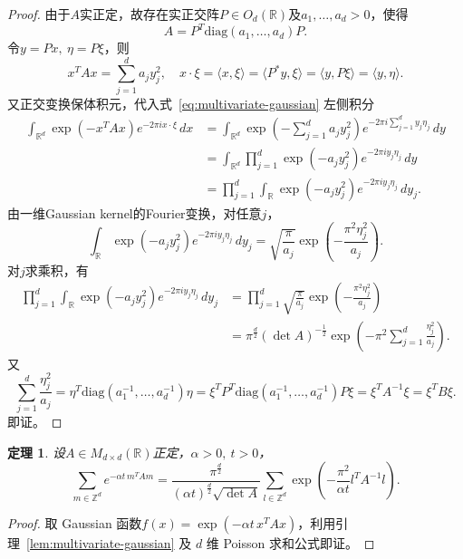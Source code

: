 \documentclass[UTF8,zihao=5,linespread=1.34]{ctexart}
\theoremstyle{cnplain}
\newtheorem{theorem}{定理}[section]
\theoremstyle{cnremark}
\begin{document}
\begin{proof}
由于$A$实正定，故存在实正交阵$P \in O_{d}(\mathbb{R})$及$a_{1}, \dots, a_{d} > 0$，使得
\[
A = P^{T} \mathrm{diag}(a_{1}, \dots, a_{d}) P.
\]
令$y = Px,\ \eta = P\xi$，则
\[
x^{T}Ax = \sum_{j=1}^{d} a_{j} y_{j}^{2},\quad x \cdot \xi = \langle x, \xi \rangle = \langle P^{\ast}y, \xi \rangle = \langle y, P\xi \rangle = \langle y, \eta \rangle.
\]
又正交变换保体积元，代入式~\eqref{eq:multivariate-gaussian} 左侧积分
\begin{align*}
\int_{\mathbb{R}^{d}} \exp(-x^{T} A x) e^{-2\pi i x \cdot \xi}\,dx
&= \int_{\mathbb{R}^{d}} \exp\left(-\sum_{j=1}^{d} a_{j} y_{j}^{2}\right) e^{-2\pi i \sum_{j=1}^{d} y_{j}\eta_{j}}\,dy \\
&= \int_{\mathbb{R}^{d}} \prod_{j=1}^{d} \exp(-a_{j} y_{j}^{2}) e^{-2\pi i y_{j}\eta_{j}}\,dy \\
&= \prod_{j=1}^{d} \int_{\mathbb{R}} \exp(-a_{j} y_{j}^{2}) e^{-2\pi i y_{j}\eta_{j}}\,dy_{j}.
\end{align*}
由一维Gaussian kernel的Fourier变换，对任意$j$，
\[
\int_{\mathbb{R}} \exp(-a_{j} y_{j}^{2}) e^{-2\pi i y_{j}\eta_{j}}\,dy_{j}
= \sqrt{\frac{\pi}{a_{j}}} \exp\left(-\frac{\pi^{2} \eta_{j}^{2}}{a_{j}}\right).
\]
对$j$求乘积，有
\begin{align*}
\prod_{j=1}^{d} \int_{\mathbb{R}} \exp(-a_{j} y_{j}^{2}) e^{-2\pi i y_{j}\eta_{j}}\,dy_{j}
&= \prod_{j=1}^{d} \sqrt{\frac{\pi}{a_{j}}} \exp\left(-\frac{\pi^{2} \eta_{j}^{2}}{a_{j}}\right) \\
&= \pi^{\frac{d}{2}} (\det A)^{-\frac{1}{2}} \exp\left(-\pi^{2} \sum_{j=1}^{d} \frac{\eta_{j}^{2}}{a_{j}}\right).
\end{align*}
又
\[
\sum_{j=1}^{d} \frac{\eta_{j}^{2}}{a_{j}}
= \eta^{T} \mathrm{diag}(a_{1}^{-1}, \dots, a_{d}^{-1}) \eta
= \xi^{T} P^{T} \mathrm{diag}(a_{1}^{-1}, \dots, a_{d}^{-1}) P \xi
= \xi^{T} A^{-1} \xi
= \xi^{T} B \xi.
\]
即证。
\end{proof}

\begin{theorem}\label{thm:lattice-gaussian}
设$A \in M_{d \times d}(\mathbb{R})$正定，$\alpha > 0,\ t > 0$，
\[
\sum_{m \in \mathbb{Z}^{d}} e^{-\alpha t\, m^{T} A m}
= \frac{\pi^{\frac{d}{2}}}{(\alpha t)^{\frac{d}{2}} \sqrt{\det A}}
  \sum_{l \in \mathbb{Z}^{d}} \exp\left(-\frac{\pi^{2}}{\alpha t} l^{T} A^{-1} l\right).
\]
\end{theorem}

\begin{proof}
取 Gaussian 函数$f(x) = \exp(-\alpha t\, x^{T} A x)$，利用引理~\ref{lem:multivariate-gaussian} 及 $d$ 维 Poisson 求和公式即证。
\end{proof}
\end{document}
